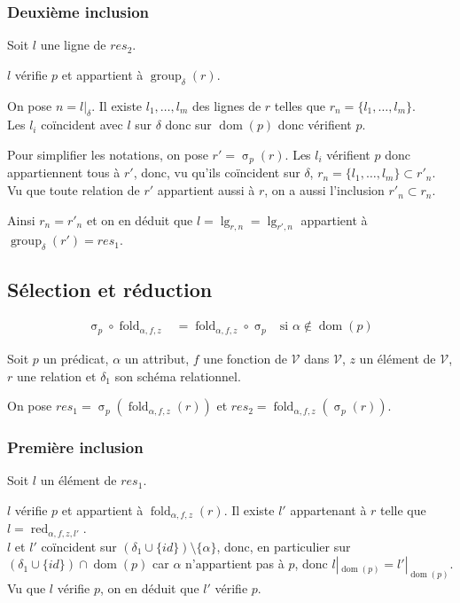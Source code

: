 \documentclass[french]{article}
\DeclareMathOperator{\sel}{\sigma}
\DeclareMathOperator{\group}{group}
\DeclareMathOperator{\dom}{dom}
\DeclareMathOperator{\lgr}{lg}
\DeclareMathOperator{\redu}{red}
\newcommand{\selP}{\sel_p}
\newcommand{\groupDelta}{\group_{\delta}}
\newcommand{\val}{\mathcal{V}}
\newcommand{\cip}{\cup \{id\}}
\newcommand{\fold}[3]{\operatorname{fold}_{#1, #2, #3}}
\newcommand{\foldAlphafz}{\fold{\alpha}{f}{z}}
\begin{document}
\subsubsection*{Deuxième inclusion}
Soit $l$ une ligne de $res_2$.

$l$ vérifie $p$ et appartient à $\groupDelta(r)$.

On pose $n = l|_\delta$. Il existe $l_1, \dots, l_m$
des lignes de $r$ telles que $r_n = \{l_1, \dots, l_m\}$. \\

Les $l_i$ coïncident avec $l$ sur $\delta$ donc sur $\dom(p)$
donc vérifient $p$.

Pour simplifier les notations, on pose $r' = \selP(r)$.
Les $l_i$ vérifient $p$ donc appartiennent tous à $r'$,
donc, vu qu'ils coïncident sur $\delta$,
$r_n = \{l_1, \dots, l_m \} \subset r'_n$.
Vu que toute relation de $r'$ appartient aussi à $r$,
on a aussi l'inclusion $r'_n \subset r_n$.

Ainsi $r_n = r'_n$ et on en déduit que 
$l = \lgr_{r,n} = \lgr_{r', n}$ appartient
à $\groupDelta(r') = res_1$.

\subsection*{Sélection et réduction}
\begin{align}
\selP \circ \foldAlphafz & = \foldAlphafz \circ \selP
& \text{si $\alpha \notin \dom(p)$}
\end{align}

Soit $p$ un prédicat, $\alpha$ un attribut,
$f$ une fonction de $\val$ dans $\val$,
$z$ un élément de $\val$, $r$ une relation
et $\delta_1$ son schéma relationnel.

On pose
$res_1 = \selP(\foldAlphafz(r))$
et
$res_2 = \foldAlphafz(\selP(r))$.

\subsubsection*{Première inclusion}
Soit $l$ un élément de $res_1$.

$l$ vérifie $p$ et appartient à $\foldAlphafz(r)$.
Il existe $l'$ appartenant à $r$ telle que
$l = \redu_{\alpha, f, z, l'}$. \\

$l$ et $l'$ coïncident sur $(\delta_1 \cip) \setminus \{ \alpha \}$,
donc, en particulier sur $(\delta_1 \cip) \cap \dom(p)$ car
$\alpha$ n'appartient pas à $p$, donc $l|_{\dom(p)} = l'|_{\dom(p)}$.
Vu que $l$ vérifie $p$, on en déduit que $l'$ vérifie $p$.
\end{document}
